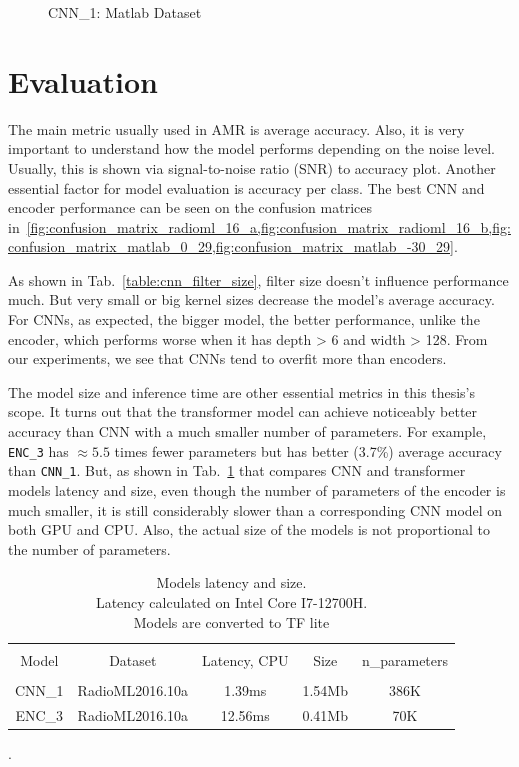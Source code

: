\begin{figure}[t]
\centering
\caption{ CNN\_1: Matlab Dataset }

\label{fig:cnn_1}
\end{figure}

\section{Evaluation}

The main metric usually used in AMR is average accuracy. Also, it is very important to understand how the model performs depending on the noise level. Usually, this is shown via signal-to-noise ratio (SNR) to accuracy plot. Another essential factor for model evaluation is accuracy per class. The best CNN and encoder performance can be seen on the confusion matrices in~\cref{fig:confusion_matrix_radioml_16_a,fig:confusion_matrix_radioml_16_b,fig:confusion_matrix_matlab_0_29,fig:confusion_matrix_matlab_-30_29}.

As shown in Tab.~\ref{table:cnn_filter_size}, filter size doesn't influence performance much. But very small or big kernel sizes decrease the model's average accuracy. For CNNs, as expected, the bigger model, the better performance, unlike the encoder, which performs worse when it has depth > 6 and width > 128. From our experiments, we see that CNNs tend to overfit more than encoders.

The model size and inference time are other essential metrics in this thesis's scope. It turns out that the transformer model can achieve noticeably better accuracy than CNN with a much smaller number of parameters. For example, \verb|ENC_3| has $\approx 5.5$ times fewer parameters but has better (3.7\%) average accuracy than \verb|CNN_1|. But, as shown in Tab.~\ref{table:latency_size} that compares CNN and transformer models latency and size, even though the number of parameters of the encoder is much smaller, it is still considerably slower than a corresponding CNN model on both GPU and CPU. Also, the actual size of the models is not proportional to the number of parameters.

\begin{table}[h!]
\centering
\begin{tabular}{| c  c  c  c  c|} 
 \hline \\[-1em]
 Model & Dataset & Latency, CPU &  Size & n\_parameters \\ [1ex]  \\[-1em]  
 \hline
    CNN\_1 & RadioML2016.10a & 1.39ms & 1.54Mb & 386K\\ [1ex]
    ENC\_3 & RadioML2016.10a & 12.56ms & 0.41Mb & 70K\\ [1ex]

\hline
\end{tabular}
\caption{Models latency and size.\\Latency calculated on Intel Core I7-12700H.\\Models are converted to TF lite}.
\label{table:latency_size}
\end{table}


